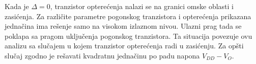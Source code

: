 Kada je $\Delta=0$, tranzistor opterećenja nalazi se na granici omske oblasti i zasićenja. Za različite parametre pogonskog tranzistora i opterećenja prikazana jednačina ima rešenje samo na visokom izlaznom nivou. Ulazni prag tada se poklapa sa pragom uključenja pogonskog tranzistora. Ta situacija povezuje ovu analizu sa slučajem u kojem tranzistor opterećenja radi u zasićenju. Za opšti slučaj zgodno je rešavati kvadratnu jednačinu po padu napona $V_{DD}-V_O$.
